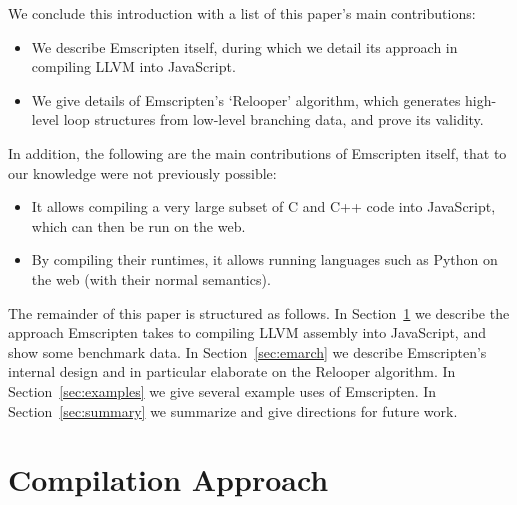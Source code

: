 \documentclass[preprint,10pt]{sigplanconf}
\begin{document}
We conclude this introduction with a list of this paper's main contributions:
\begin{itemize}
\item We describe Emscripten itself, during
      which we detail its approach in compiling LLVM into JavaScript.
\item We give details of Emscripten's `Relooper' algorithm, which generates
      high-level loop structures from low-level branching data, and prove
      its validity.
\end{itemize}
In addition, the following are the main contributions of Emscripten
itself, that to our knowledge were not previously possible:
\begin{itemize}
\item It allows compiling a very large subset of C and C++ code into
      JavaScript, which can then be run on the web.
\item By compiling their runtimes, it allows running languages such as Python
      on the web (with their normal semantics).
\end{itemize}

The remainder of this paper is structured as follows. In Section~\ref{sec:compapp} we
describe the approach Emscripten takes to compiling LLVM assembly into JavaScript,
and show some benchmark data.
In Section~\ref{sec:emarch} we describe Emscripten's internal design and in
particular elaborate on the Relooper algorithm.
In Section~\ref{sec:examples} we give several example uses of
Emscripten. In Section~\ref{sec:summary} we summarize and give directions for future
work.

\section{Compilation Approach}
\label{sec:compapp}
\end{document}

